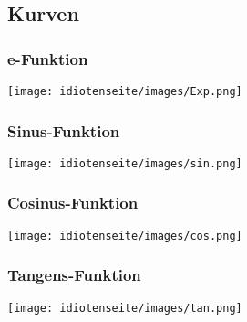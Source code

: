 \subsection{Kurven}
\begin{multicols}{4}
\subsubsection{e-Funktion}
\texttt{[image: idiotenseite/images/Exp.png]}
\subsubsection{Sinus-Funktion}
\texttt{[image: idiotenseite/images/sin.png]}
\subsubsection{Cosinus-Funktion}
\texttt{[image: idiotenseite/images/cos.png]}
\subsubsection{Tangens-Funktion}
\texttt{[image: idiotenseite/images/tan.png]}
\end{multicols}